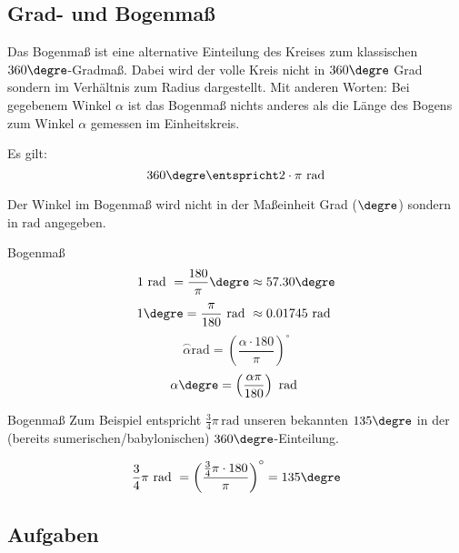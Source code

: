 
\subsection{Grad- und Bogenmaß}

Das Bogenmaß ist eine alternative Einteilung des Kreises zum
klassischen $360\degre$-Gradmaß. Dabei wird der volle Kreis nicht in
$360\degre$ Grad sondern im Verhältnis zum Radius dargestellt. Mit
anderen Worten: Bei gegebenem Winkel $\alpha$ ist das Bogenmaß nichts
anderes als die Länge des Bogens zum Winkel $\alpha$ gemessen im Einheitskreis.


Es gilt:
$$360\degre \entspricht 2\cdot\pi \textrm{\,\,rad}$$

Der Winkel im Bogenmaß wird nicht in der Maßeinheit Grad (${}\degre$)
sondern in $\textrm{rad}$ angegeben.

\begin{gesetz}{Bogenmaß}{}
$$1 \textrm{ rad } = \frac{180}{\pi}\degre \approx 57.30\degre$$
$$1\degre = \frac{\pi}{180} \textrm{ rad } \approx 0.01745 \textrm{ rad }$$
$$\stackrel{\frown}{\alpha} \textrm{rad} = \left(\frac{\alpha\cdot{}180}{\pi}\right)^\circ$$
$$\alpha\degre = \left(\frac{\alpha\pi}{180}\right) \textrm{ rad }$$  
\end{gesetz}

\begin{beispiel}{Bogenmaß}{}
 Zum Beispiel entspricht
$\frac{3}{4}\pi\,\textrm{rad}$ unseren bekannten $135\degre$ in der
(bereits sumerischen/babylonischen) $360\degre$-Einteilung.

 $$\frac34\pi \textrm{ rad } = \left(\frac{\frac34\pi\cdot{}180}{\pi}\right)^\circ = 135\degre$$
\end{beispiel}
\newpage

\subsection*{Aufgaben}
\newpage
